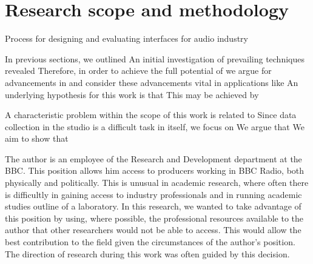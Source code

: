 \section{Research scope and methodology}

Process for designing and evaluating interfaces for audio industry \citep{Dewey2014}

In previous sections, we outlined
An initial investigation of prevailing techniques revealed
Therefore, in order to achieve the full potential of 
we argue for advancements in 
and consider these advancements vital in applications like 
An underlying hypothesis for this work is that
This may be achieved by

A characteristic problem within the scope of this work is related to 
Since data collection in the studio is a difficult task in itself, we focus on
We argue that
We aim to show that

The author is an employee of the  Research and Development department at the BBC. This position allows him access to
producers working in BBC Radio, both physically and politically. This is unusual in academic research, where often
there is difficultly in gaining access to industry professionals and in running academic studies outline of a
laboratory. In this research, we wanted to take advantage of this position by using, where possible, the professional
resources available to the author that other researchers would not be able to access. This would allow the best
contribution to the field given the circumstances of the author's position. The direction of research during this work
was often guided by this decision.

